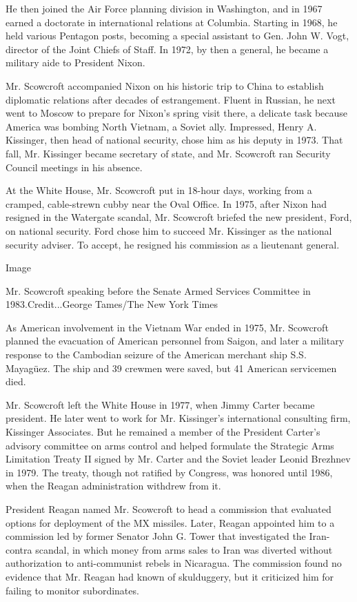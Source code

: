 He then joined the Air Force planning division in Washington, and in
1967 earned a doctorate in international relations at Columbia. Starting
in 1968, he held various Pentagon posts, becoming a special assistant to
Gen. John W. Vogt, director of the Joint Chiefs of Staff. In 1972, by
then a general, he became a military aide to President Nixon.

Mr. Scowcroft accompanied Nixon on his historic trip to China to
establish diplomatic relations after decades of estrangement. Fluent in
Russian, he next went to Moscow to prepare for Nixon's spring visit
there, a delicate task because America was bombing North Vietnam, a
Soviet ally. Impressed, Henry A. Kissinger, then head of national
security, chose him as his deputy in 1973. That fall, Mr. Kissinger
became secretary of state, and Mr. Scowcroft ran Security Council
meetings in his absence.

At the White House, Mr. Scowcroft put in 18-hour days, working from a
cramped, cable-strewn cubby near the Oval Office. In 1975, after Nixon
had resigned in the Watergate scandal, Mr. Scowcroft briefed the new
president, Ford, on national security. Ford chose him to succeed Mr.
Kissinger as the national security adviser. To accept, he resigned his
commission as a lieutenant general.

Image

Mr. Scowcroft speaking before the Senate Armed Services Committee in
1983.Credit...George Tames/The New York Times

As American involvement in the Vietnam War ended in 1975, Mr. Scowcroft
planned the evacuation of American personnel from Saigon, and later a
military response to the Cambodian seizure of the American merchant ship
S.S. Mayagüez. The ship and 39 crewmen were saved, but 41 American
servicemen died.

Mr. Scowcroft left the White House in 1977, when Jimmy Carter became
president. He later went to work for Mr. Kissinger's international
consulting firm, Kissinger Associates. But he remained a member of the
President Carter's advisory committee on arms control and helped
formulate the Strategic Arms Limitation Treaty II signed by Mr. Carter
and the Soviet leader Leonid Brezhnev in 1979. The treaty, though not
ratified by Congress, was honored until 1986, when the Reagan
administration withdrew from it.

President Reagan named Mr. Scowcroft to head a commission that evaluated
options for deployment of the MX missiles. Later, Reagan appointed him
to a commission led by former Senator John G. Tower that investigated
the Iran-contra scandal, in which money from arms sales to Iran was
diverted without authorization to anti-communist rebels in Nicaragua.
The commission found no evidence that Mr. Reagan had known of
skulduggery, but it criticized him for failing to monitor subordinates.

